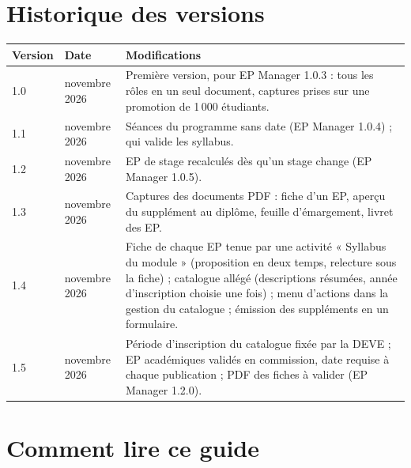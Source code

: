 \documentclass[11pt,a4paper]{article}
\begin{document}

\tableofcontents

\section*{Historique des versions}

\begin{center}
\begin{tabularx}{\linewidth}{@{}l l X@{}}
\toprule
\textbf{Version} & \textbf{Date} & \textbf{Modifications} \\
\midrule
1.0 & novembre 2026 & Première version, pour EP Manager 1.0.3 : tous les rôles en un seul
document, captures prises sur une promotion de 1\,000 étudiants. \\
1.1 & novembre 2026 & Séances du programme sans date (EP Manager 1.0.4) ; qui valide les
syllabus. \\
1.2 & novembre 2026 & EP de stage recalculés dès qu'un stage change (EP Manager 1.0.5). \\
1.3 & novembre 2026 & Captures des documents PDF : fiche d'un EP, aperçu du supplément au diplôme,
feuille d'émargement, livret des EP. \\
1.4 & novembre 2026 & Fiche de chaque EP tenue par une activité « Syllabus du module » (proposition en deux temps, relecture sous la fiche) ; catalogue allégé (descriptions résumées, année d'inscription choisie une fois) ; menu d'actions dans la gestion du catalogue ; émission des suppléments en un formulaire. \\
1.5 & novembre 2026 & Période d'inscription du catalogue fixée par la DEVE ; EP académiques validés en commission, date requise à chaque publication ; PDF des fiches à valider (EP Manager 1.2.0). \\
\bottomrule
\end{tabularx}
\end{center}

\section*{Comment lire ce guide}
\end{document}
